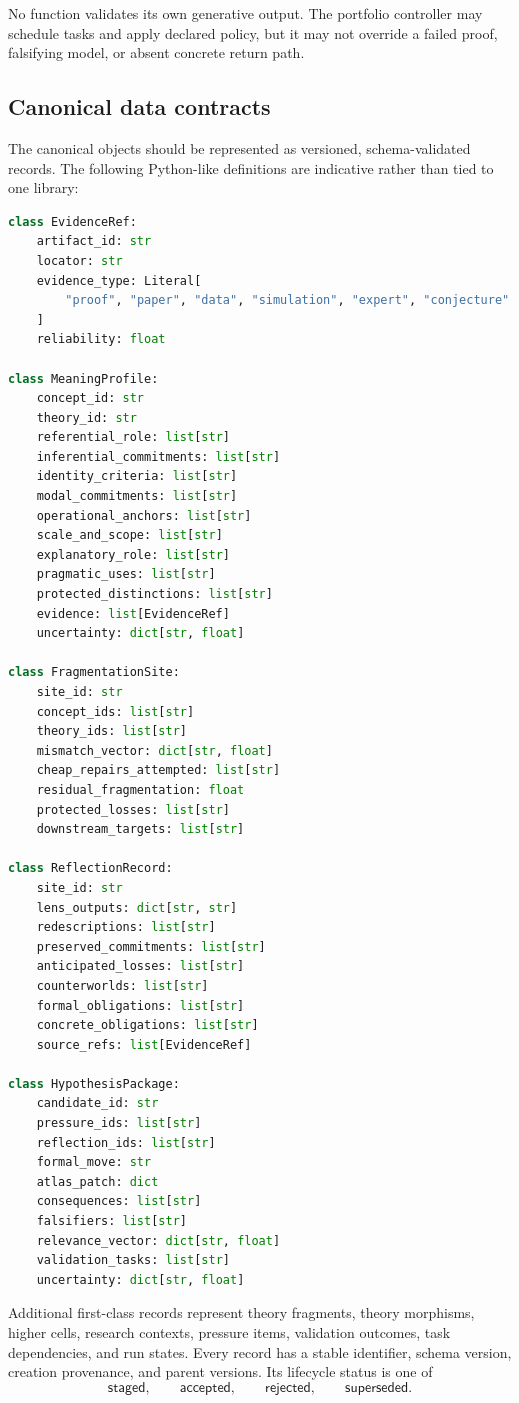 \documentclass[11pt]{article}
\begin{document}
No function validates its own generative output. The portfolio controller may schedule tasks and apply
declared policy, but it may not override a failed proof, falsifying model, or absent concrete return
path.

\subsection{Canonical data contracts}

The canonical objects should be represented as versioned, schema-validated records. The following
Python-like definitions are indicative rather than tied to one library:

\begin{lstlisting}[style=spec,language=Python,caption={Core typed records.}]
class EvidenceRef:
    artifact_id: str
    locator: str
    evidence_type: Literal[
        "proof", "paper", "data", "simulation", "expert", "conjecture"
    ]
    reliability: float

class MeaningProfile:
    concept_id: str
    theory_id: str
    referential_role: list[str]
    inferential_commitments: list[str]
    identity_criteria: list[str]
    modal_commitments: list[str]
    operational_anchors: list[str]
    scale_and_scope: list[str]
    explanatory_role: list[str]
    pragmatic_uses: list[str]
    protected_distinctions: list[str]
    evidence: list[EvidenceRef]
    uncertainty: dict[str, float]

class FragmentationSite:
    site_id: str
    concept_ids: list[str]
    theory_ids: list[str]
    mismatch_vector: dict[str, float]
    cheap_repairs_attempted: list[str]
    residual_fragmentation: float
    protected_losses: list[str]
    downstream_targets: list[str]

class ReflectionRecord:
    site_id: str
    lens_outputs: dict[str, str]
    redescriptions: list[str]
    preserved_commitments: list[str]
    anticipated_losses: list[str]
    counterworlds: list[str]
    formal_obligations: list[str]
    concrete_obligations: list[str]
    source_refs: list[EvidenceRef]

class HypothesisPackage:
    candidate_id: str
    pressure_ids: list[str]
    reflection_ids: list[str]
    formal_move: str
    atlas_patch: dict
    consequences: list[str]
    falsifiers: list[str]
    relevance_vector: dict[str, float]
    validation_tasks: list[str]
    uncertainty: dict[str, float]
\end{lstlisting}

Additional first-class records represent theory fragments, theory morphisms, higher cells, research
contexts, pressure items, validation outcomes, task dependencies, and run states. Every record has a
stable identifier, schema version, creation provenance, and parent versions. Its lifecycle status is
one of
\begin{equation}
\mathsf{staged},\qquad
\mathsf{accepted},\qquad
\mathsf{rejected},\qquad
\mathsf{superseded}.
\end{equation}
\end{document}
